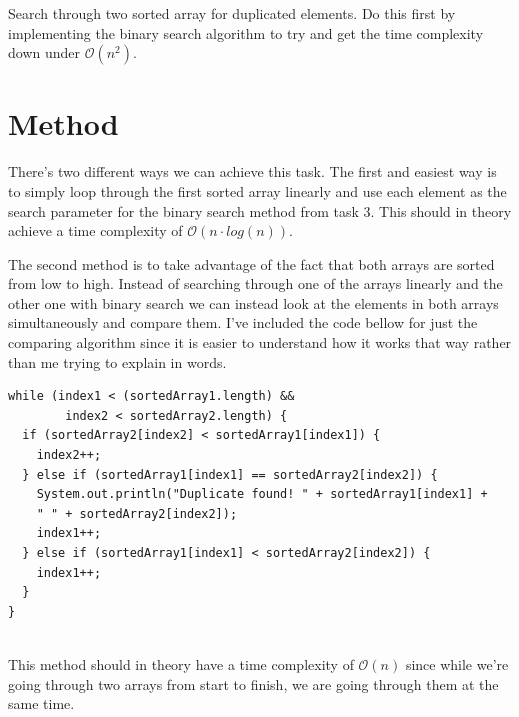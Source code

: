 \documentclass[a4paper,11pt]{article}
\begin{document}
Search through two sorted array for duplicated elements. Do this first by implementing the binary
search algorithm to try and get the time complexity down under $\mathcal{O}(n^2)$.
\section*{Method}
There's two different ways we can achieve this task. The first and easiest way is to simply
loop through the first sorted array linearly and use each element as the search parameter for the
binary search method from task 3. This should in theory achieve a time complexity of
$\mathcal{O}(n\cdot log(n))$.

The second method is to take advantage of the fact that both arrays are sorted from low to high.
Instead of searching through one of the arrays linearly and the other one with binary search we can
instead look at the elements in both arrays simultaneously and compare them. I've included the code
bellow for just the comparing algorithm since it is easier to understand how it works that way rather
than me trying to explain in words.

\begin{verbatim}
while (index1 < (sortedArray1.length) && 
        index2 < sortedArray2.length) {
  if (sortedArray2[index2] < sortedArray1[index1]) {
    index2++;
  } else if (sortedArray1[index1] == sortedArray2[index2]) {
    System.out.println("Duplicate found! " + sortedArray1[index1] + 
    " " + sortedArray2[index2]);
    index1++;
  } else if (sortedArray1[index1] < sortedArray2[index2]) {
    index1++;
  }
}
    
\end{verbatim}
This method should in theory have a time complexity of $\mathcal{O}(n)$ since while we're going
through two arrays from start to finish, we are going through them at the same time.
\end{document}

